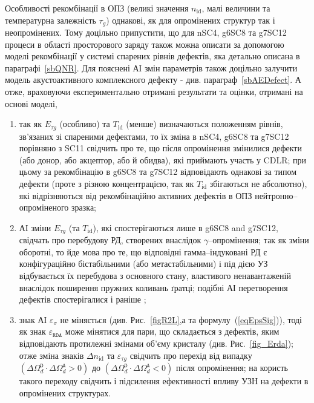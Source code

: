 Особливості рекомбінації в ОПЗ (великі значення $n_\mathrm{id}$, малі величини та температурна залежність $\tau_g$)
однакові, як  для опромінених структур так і неопромінених.
Тому доцільно припустити, що для nSC4, g6SC8 та g7SC12 процеси в області просторового заряду також можна описати
за допомогою моделі рекомбінації у системі спарених рівнів дефектів, яка детально описана в параграфі~\ref{sbQNR}.
Для пояснені АІ змін параметрів також доцільно залучити модель акустоактивного комплексного дефекту - див. параграф~\ref{sbAEDefect}.
А отже, враховуючи експериментально отримані результати та оцінки, отримані на основі моделі,
\begin{enumerate}[label=\asbuk*),leftmargin=0em,itemindent=1.5em]
\item так як $E_{\tau g}$ (особливо) та $T_{\mathrm{id}}$ (менше) визначаються положенням рівнів, зв'язаних
зі спареними дефектами, то їх зміна в nSC4, g6SC8 та g7SC12 порівняно з SC11 свідчить про те, що
після опромінення змінилися дефекти (або донор, або акцептор, або й обидва), які приймають участь у CDLR;
при цьому за рекомбінацію в g6SC8 та g7SC12 відповідають однакові за типом дефекти (проте з різною концентрацією,
 так як $T_{\mathrm{id}}$ збігаються не абсолютно), які відрізняються від рекомбінаційно активних дефектів в ОПЗ нейтронно--опроміненого зразка;

\item  АІ зміни   $E_{\tau g}$ (та $T_{\mathrm{id}}$), які спостерігаються лише в g6SC8 and g7SC12,
 свідчать про перебудову РД, створених внаслідок $\gamma$--опромінення;
 так як зміни оборотні, то йде мова про те, що відповідні
 гамма--індуковані РД є конфігураційно бістабільними (або метастабільними) і під дією УЗ відбувається їх перебудова з основного стану,
 властивого ненавантаженій внаслідок поширення пружних коливань ґратці;
 подібні АІ перетворення дефектів спостерігалися і раніше \cite{Wosinski,Ostapenko1994,YOlikhTPL2011r};

 \item знак АІ $\varepsilon_{\sigma}$ не міняється (див. Рис.~\ref{figR2L},а та формулу~(\ref{eqEpsSig})), тоді як
  знак  $\varepsilon_{\mathtt{RDA}}$  може мінятися для пари, що складається з дефектів, яким відповідають протилежні
  змінами об'єму кристалу (див. Рис.~\ref{fig_Erda});
  отже зміна знаків $\Delta n_{\mathrm{id}}$ та $\varepsilon_{\tau g}$ свідчить про перехід від випадку
  $(\Delta\Omega_d^\mathtt{D}\cdot\Delta\Omega_d^\mathtt{A}>0)$ до
  $(\Delta\Omega_d^\mathtt{D}\cdot\Delta\Omega_d^\mathtt{A}<0)$ після опромінення;
  на користь такого переходу свідчить і підсилення ефективності впливу УЗН на дефекти в опромінених структурах.
\end{enumerate}

